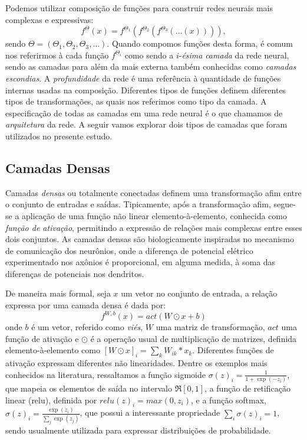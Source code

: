 Podemos utilizar composição de funções para construir redes neurais mais complexas e expressivas:
\begin{equation}
f^{\Theta}(x) = f^{\Theta_1}(f^{\Theta_2} (f^{\Theta_3}(\ldots(x))) ),
\end{equation}
sendo $\Theta = (\Theta_1, \Theta_2, \Theta_3, \ldots)$.
Quando compomos funções desta forma, é comum nos referirmos à cada função $f^{\Theta_i}$ como sendo a $i$-\textit{ésima} \textit{camada} da rede neural, sendo as camadas para além da mais externa também conhecidas como \textit{camadas escondias}. A \textit{profundidade} da rede é uma referência à quantidade de funções internas usadas na composição. Diferentes tipos de funções definem diferentes tipos de transformações, as quais nos referimos como tipo da camada. A especificação de todas as camadas em uma rede neural é o que chamamos de \textit{arquitetura} da rede. A seguir vamos explorar dois tipos de camadas que foram utilizados no presente estudo.

\subsection{Camadas Densas}

Camadas \textit{densas} ou totalmente conectadas definem uma transformação afim entre o conjunto de entradas e saídas. Tipicamente, após a transformação afim, segue-se a aplicação de uma função não linear elemento-à-elemento, conhecida como \textit{função de ativação}, permitindo a expressão de relações mais complexas entre esses dois conjuntos. As camadas densas são biologicamente inspiradas no mecanismo de comunicação dos neurônios, onde a diferença de potencial elétrico experimentado nos axônios é proporcional, em alguma medida, à soma das diferenças de potenciais nos dendritos.

De maneira mais formal, seja $x$ um vetor no conjunto de entrada, a relação expressa por uma camada densa é dada por:
\begin{equation}
f^{W,b}(x) = act(W \odot x + b)
\end{equation}
onde $b$ é um vetor, referido como \textit{viés}, $W$ uma matriz de transformação, $act$ uma função de ativação e $\odot$ é a operação usual de multiplicação de matrizes, definida elemento-à-elemento como $[W \odot x]_{i} = \sum_k W_{ik} * x_k$. Diferentes funções de ativação expressam diferentes não linearidades. Dentre os exemplos mais conhecidos na literatura, ressaltamos a função sigmoide $\sigma(z)_i = \frac{1}{1+\exp(-z_i)}$, que mapeia os elementos de saída no intervalo $\Re[0,1]$, a função de retificação linear (relu), definida por $relu(z)_i = max(0, z_i)$, e a função softmax, $\sigma(z)_i = \frac{\exp(z_i)}{\sum_j \exp(z_j)}$, que possui a interessante propriedade $\sum_i \sigma(z)_i = 1$, sendo usualmente utilizada para expressar distribuições de probabilidade.



